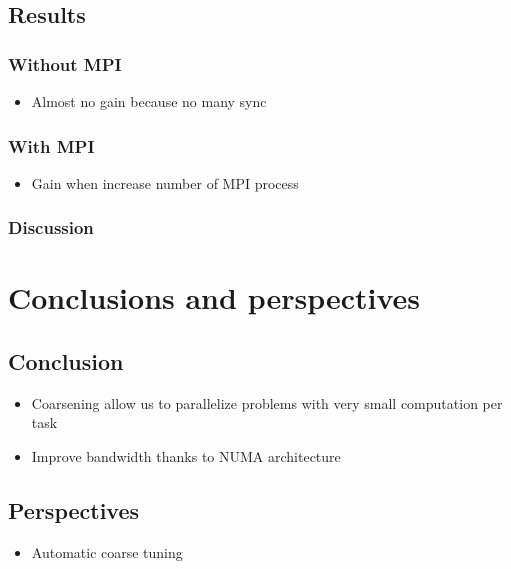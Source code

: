 \documentclass[oneside,12t]{classes/Thesis}
\begin{document}
\section{Results}
\subsection{Without MPI}
  \begin{itemize}
    \item Almost no gain because no many sync
  \end{itemize}
\subsection{With MPI}
  \begin{itemize}
    \item Gain when increase number of MPI process
  \end{itemize}
\subsection{Discussion}




\chapter{Conclusions and perspectives}
\minitoc
\vspace{1cm}
\section{Conclusion}
  \begin{itemize}
    \item Coarsening allow us to parallelize problems with very small computation per task
    \item Improve bandwidth thanks to NUMA architecture
  \end{itemize}


\section{Perspectives}
  \begin{itemize}
    \item Automatic coarse tuning
  \end{itemize}



\backmatter %
%
%
\appendix



\end{document}
